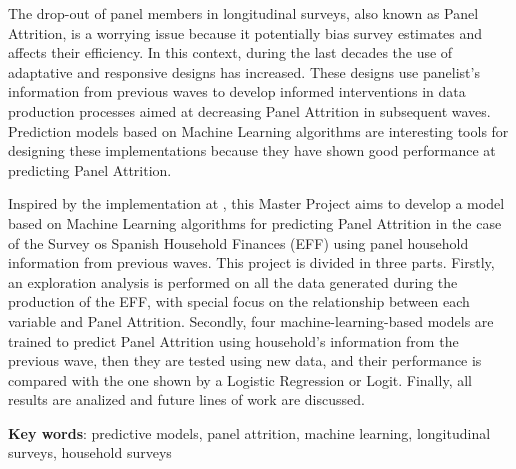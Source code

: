 \onehalfspacing

The drop-out of panel members in longitudinal surveys, also known as Panel Attrition, is a worrying issue because it potentially bias survey estimates and affects their efficiency. In this context, during the last decades the use of adaptative and responsive designs has increased. These designs use panelist's information from previous waves to develop informed interventions in data production processes aimed at decreasing Panel Attrition in subsequent waves. Prediction models based on Machine Learning algorithms are interesting tools for designing these implementations because they have shown good performance at predicting Panel Attrition.

Inspired by the implementation at \cite{beste2023case}, this Master Project aims to develop a model based on Machine Learning algorithms for predicting Panel Attrition in the case of the Survey os Spanish Household Finances (EFF) using panel household information from previous waves. This project is divided in three parts. Firstly, an exploration analysis is performed on all the data generated during the production of the EFF, with special focus on the relationship between each variable and Panel Attrition. Secondly, four machine-learning-based models are trained to predict Panel Attrition using household's information from the previous wave, then they are tested using new data, and their performance is compared with the one shown by a Logistic Regression or Logit. Finally, all results are analized and future lines of work are discussed.

\vspace{1.5cm}

\textbf{Key words}: predictive models, panel attrition, machine learning, longitudinal surveys, household surveys